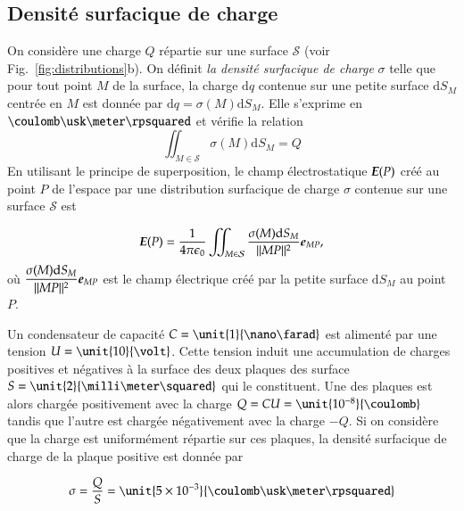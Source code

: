 \subsection{Densité surfacique de charge}
	On considère une charge $Q$ répartie sur une surface $\mathcal{S}$
	(voir Fig.~\ref{fig:distributions}b). 
	On définit \emph{
	la densité surfacique de charge} $\sigma$ 
	telle que pour tout point $M$ de la surface,
	la charge $\mathrm{d}q$ contenue sur une petite surface $\mathrm{d}S_M$ centrée 
	en $M$ est donnée par $\mathrm{d}q = \sigma(M) \mathrm{d}S_M$.
	Elle s'exprime en $\coulomb \usk  \meter \rpsquared$ et vérifie la relation
\begin{equation*}
	\iint_{M \in \mathcal{S}} \sigma(M) \mathrm{d}S_M = Q
\end{equation*}
En utilisant le principe de superposition, le champ électrostatique $\vece(P)$
créé au point $P$ de l'espace par une distribution surfacique de charge $\sigma$
contenue sur une surface $\mathcal{S}$ est

\begin{equation}
	\vece(P) = \pieps \iint_{M \in \mathcal{S}} 
	\dfrac{\sigma(M) \mathrm{d}S_M}{||MP||^2}\mitbf{e}_{MP},
\end{equation}
où $\dfrac{\sigma(M) \mathrm{d}S_M}{||MP||^2}\mitbf{e}_{MP}$ est le champ 
électrique créé par la petite surface $\mathrm{d}S_M$ au point $P$.

\begin{exemple}
	Un condensateur de capacité $C = \unit{1}{\nano \farad}$ est alimenté 
	par une tension $U = \unit{10}{\volt}$. Cette tension induit une 
	accumulation de charges positives et négatives à la surface des deux 
	plaques des surface $S = \unit{2}{\milli \meter \squared}$
	qui le constituent. Une des plaques est alors chargée positivement
	avec la charge $Q = CU = \unit{10^{-8}}{\coulomb}$ 
	tandis que l'autre est chargée négativement avec la 
	charge $-Q$. Si on considère que la charge est uniformément répartie
	sur ces plaques, la densité surfacique de charge de la plaque positive
	est donnée par

	\begin{equation*}
		\sigma = \dfrac{Q}{S} = \unit{5 \times 10^{-3}}
		                        {\coulomb \usk \meter \rpsquared}
	\end{equation*}
\end{exemple}

